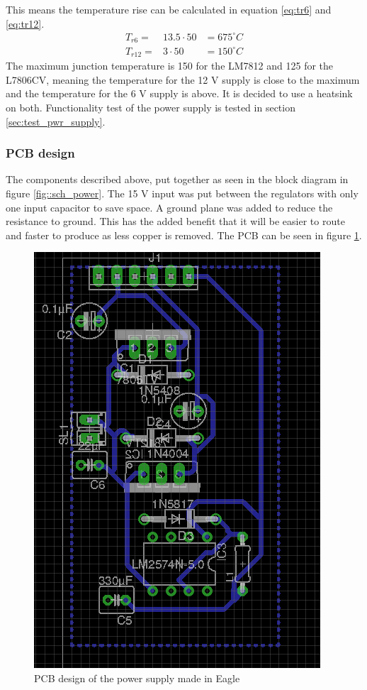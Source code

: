 This means the temperature rise can be calculated in equation \ref{eq:tr6} and \ref{eq:tr12}.
\begin{eqnarray}
T_{r6}  =&  13.5 \cdot 50   &= 675^\circ C \label{eq:tr6}\\
T_{r12} =&  3 \cdot 50      &= 150^\circ C \label{eq:tr12}
\end{eqnarray}
The maximum junction temperature is 150 for the LM7812\cite[p. 3]{ds:LM78XX} and 125 for the L7806CV\cite[p. 7]{ds:L7806CV}, meaning the temperature for the 12 V supply is close to the maximum and the temperature for the 6 V supply is above.
It is decided to use a heatsink on both.
Functionality test of the power supply is tested in section \ref{sec:test_pwr_supply}.

\subsubsection{PCB design}
The components described above, put together as seen in the block diagram in figure \ref{fig::sch_power}. 
The 15 V input was put between the regulators with only one input capacitor to save space.
A ground plane was added to reduce the resistance to ground.
This has the added benefit that it will be easier to route and faster to produce as less copper is removed.
The PCB can be seen in figure \ref{fig::pcb_power}.

\begin{figure}[ht]
\centering
\includegraphics[angle=90,scale=0.5]{img/pcb_power.png}
\caption{PCB design of the power supply made in Eagle} 
\label{fig::pcb_power}
\end{figure}

